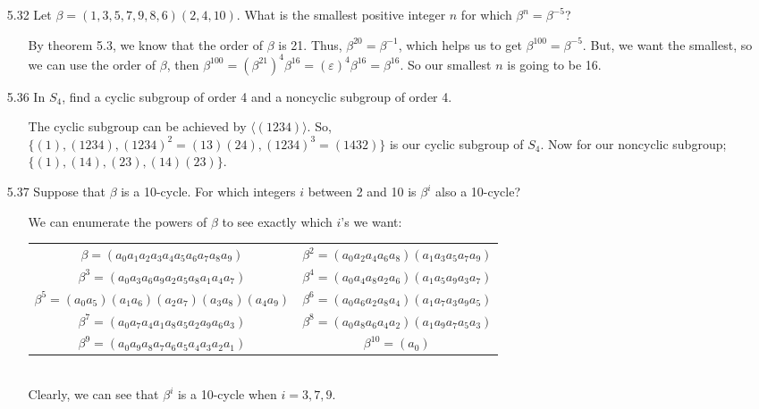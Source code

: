\documentclass[12pt]{article}
\begin{document}
\begin{enumerate}
\item[5.32] Let $\beta = (1, 3, 5, 7, 9, 8, 6)(2, 4, 10)$. What is the smallest positive
integer $n$ for which $\beta^n = \beta^{-5}$?
\begin{enumerate}
\item[] By theorem 5.3, we know that the order of $\beta$ is 21. Thus, $\beta^{20} = \beta^{-1}$,
which helps us to get $\beta^{100} = \beta^{-5}$. But, we want the smallest, so we can use the 
order of $\beta$, then $\beta^{100} = (\beta^{21})^4\beta^{16} = (\varepsilon)^4\beta^{16} = \beta^{16}$.
So our smallest $n$ is going to be 16.
\end{enumerate}

\item[5.36] In $S_4$, find a cyclic subgroup of order 4 and a noncyclic subgroup of order 4.
\begin{enumerate}
\item[] The cyclic subgroup can be achieved by $\langle (1234)\rangle$.
So, \\ $\{ (1), (1234), (1234)^2 = (13)(24), (1234)^3 = (1432)\}$ is our
cyclic subgroup of $S_4$. Now for our noncyclic subgroup; \\
$\{ (1), (14), (23), (14)(23) \}$.
\end{enumerate}

\item[5.37] Suppose that $\beta$ is a 10-cycle. For which integers $i$ between 2 and
10 is $\beta^i$ also a 10-cycle?
\begin{enumerate}
\item[] We can enumerate the powers of $\beta$ to see exactly which $i$'s we want: \\
\begin{tabular}{cc}
$\beta = (a_0a_1a_2a_3a_4a_5a_6a_7a_8a_9)$ & 
$\beta^2 = (a_0a_2a_4a_6a_8)(a_1a_3a_5a_7a_9)$ \\
$\beta^3 = (a_0a_3a_6a_9a_2a_5a_8a_1a_4a_7)$ & 
$\beta^4 = (a_0a_4a_8a_2a_6)(a_1a_5a_9a_3a_7)$ \\
$\beta^5 = (a_0a_5)(a_1a_6)(a_2a_7)(a_3a_8)(a_4a_9)$ & 
$\beta^6 = (a_0a_6a_2a_8a_4)(a_1a_7a_3a_9a_5)$ \\
$\beta^7 = (a_0a_7a_4a_1a_8a_5a_2a_9a_6a_3)$ &
$\beta^8 = (a_0a_8a_6a_4a_2)(a_1a_9a_7a_5a_3)$ \\
$\beta^9 = (a_0a_9a_8a_7a_6a_5a_4a_3a_2a_1)$ &
$\beta^{10} = (a_0)$
\end{tabular}
\\
Clearly, we can see that $\beta^i$ is a 10-cycle when $i = 3, 7, 9$.
\end{enumerate}


\end{enumerate}
\end{document}
